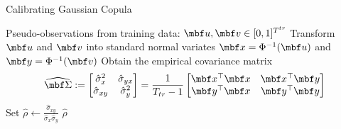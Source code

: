 
\begin{algorithm}[H]
\label{alg:calibrating_gaussian}
\caption{Calibrating Gaussian Copula}
\begin{algorithmic}[1]
\Require Pseudo-observations from training data: $\mbf u,\mbf v\in [0,1]^{T^{tr}}$
\State Transform $\mbf u$ and $\mbf v$ into standard normal variates $\mbf x=\Phi^{-1}(\mbf u)$ and $\mbf y=\Phi^{-1}(\mbf v)$%
\State Obtain the empirical covariance matrix 
$$
\widehat{\mbf \Sigma} 
:=\begin{bmatrix} 
			\hat \sigma_{x}^2 & \hat \sigma_{yx} \\
			\hat \sigma_{xy} & \hat \sigma_{y}^2
		\end{bmatrix}
= \frac{1}{T_{tr}-1}\begin{bmatrix} \mbf x^\top\mbf x & \mbf x^\top\mbf y \\ \mbf y^\top\mbf x & \mbf y^\top\mbf y \end{bmatrix}$$
\State Set $\displaystyle \hat \rho \gets \frac{\hat \sigma_{xy}}{\hat \sigma_x \hat \sigma_y}$
\Ensure $\hat \rho$
\end{algorithmic}
\end{algorithm}


